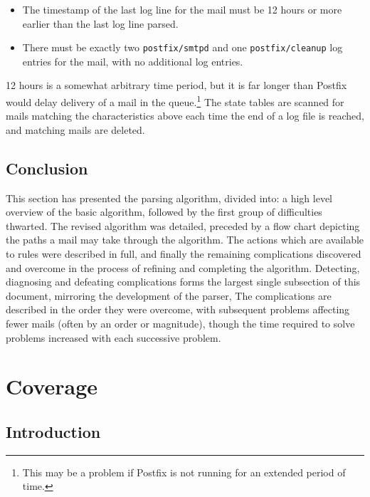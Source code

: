 \documentclass[a4paper,12pt,draft]{article}
\begin{document}
\begin{itemize}

    \item The timestamp of the last log line for the mail must be 12 hours
        or more earlier than the last log line parsed.

    \item There must be exactly two \texttt{postfix/smtpd} and one
        \texttt{postfix/cleanup} log entries for the mail, with no
        additional log entries.

\end{itemize}

12 hours is a somewhat arbitrary time period, but it is far longer than
Postfix would delay delivery of a mail in the queue.\footnote{This may be a
problem if Postfix is not running for an extended period of time.}  The
state tables are scanned for mails matching the characteristics above each
time the end of a log file is reached, and matching mails are deleted.

\subsection{Conclusion}

This section has presented the parsing algorithm, divided into: a high
level overview of the basic algorithm, followed by the first group of
difficulties thwarted.  The revised algorithm was detailed, preceded by a
flow chart depicting the paths a mail may take through the algorithm.  The
actions which are available to rules were described in full, and finally
the remaining complications discovered and overcome in the process of
refining and completing the algorithm.  Detecting, diagnosing and defeating
complications forms the largest single subsection of this document,
mirroring the development of the parser,  The complications are described
in the order they were overcome, with subsequent problems affecting fewer
mails (often by an order or magnitude), though the time required to solve
problems increased with each successive problem.

\section{Coverage}

\label{parsing coverage}

\subsection{Introduction}
\end{document}
